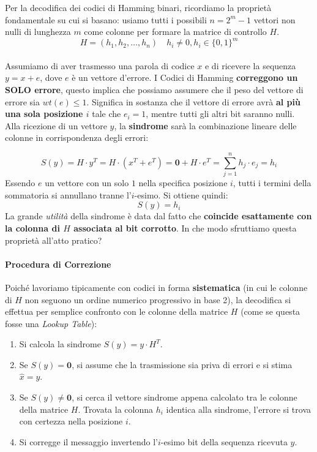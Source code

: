 Per la decodifica dei codici di Hamming binari, ricordiamo la proprietà fondamentale su cui si basano: usiamo tutti i possibili $n = 2^m - 1$ vettori non nulli di lunghezza $m$ come colonne per formare la matrice di controllo $H$.
\[H=(h_1,h_2,\dots,h_n)\quad h_i \neq 0, h_i \in \{0,1\}^m\]
\\
Assumiamo di aver trasmesso una parola di codice $x$ e di ricevere la sequenza $y = x + e$, dove $e$ è un vettore d'errore.
I Codici di Hamming \textbf{correggono un SOLO errore}, questo implica che possiamo assumere che il peso del vettore di errore sia $wt(e) \leq 1$.
Significa in sostanza che il vettore di errore avrà \textbf{al più una sola posizione $i$} tale che $e_i = 1$, mentre tutti gli altri bit saranno nulli.
\\
Alla ricezione di un vettore $y$, la \textbf{sindrome} sarà la combinazione lineare delle colonne in corrispondenza degli errori:

\[S(y)=H\cdot y^T = H \cdot (x^T + e^T)= \mathbf{0} + H \cdot e^T= \sum_{j=1}^n h_j \cdot e_j = h_i\]
Essendo $e$ un vettore con un solo $1$ nella specifica posizione $i$, tutti i termini della sommatoria si annullano tranne l'$i$-esimo.
Si ottiene quindi:
\[ S(y) = h_i \]
La grande \textit{utilità} della sindrome è data dal fatto che \textbf{coincide esattamente con la colonna di $H$ associata al bit corrotto}. In che modo sfruttiamo questa proprietà all'atto pratico?

\paragraph{Procedura di Correzione}
Poiché lavoriamo tipicamente con codici in forma \textbf{sistematica} (in cui le colonne di $H$ non seguono un ordine numerico progressivo in base 2), la decodifica si effettua per semplice confronto con le colonne della matrice $H$ (come se questa fosse una \textit{Lookup Table}):
\begin{enumerate}
    \item Si calcola la sindrome $S(y) = y \cdot H^T$.
    \item Se $S(y) = \mathbf{0}$, si assume che la trasmissione sia priva di errori e si stima $\hat{x} = y$.
    \item Se $S(y) \neq \mathbf{0}$, si cerca il vettore sindrome appena calcolato tra le colonne della matrice $H$. Trovata la colonna $h_i$ identica alla sindrome, l'errore si trova con certezza nella posizione $i$.
    \item Si corregge il messaggio invertendo l'$i$-esimo bit della sequenza ricevuta $y$.
\end{enumerate}

